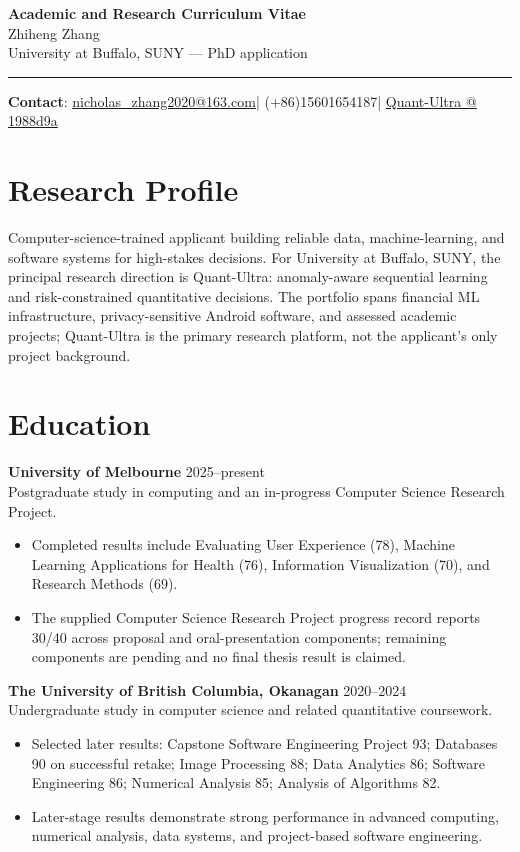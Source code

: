 \documentclass[11pt]{article}
\makeatletter
\newcommand{\ApplicantName}{Zhiheng Zhang}
\newcommand{\ApplicantEmail}{\href{mailto:nicholas_zhang2020@163.com}{nicholas\_zhang2020@163.com}}
\newcommand{\ApplicantPhone}{(+86)15601654187}
\newcommand{\ApplicantGitHub}{\href{https://github.com/zhiheng-zhang-Mera/Quant-Ultra/tree/1988d9a8530da91a8158de864d098ea869098923}{Quant-Ultra @ 1988d9a}}
\makeatother
\begin{document}
\begin{center}
{\LARGE\bfseries Academic and Research Curriculum Vitae}\\[0.25em]
{\large \ApplicantName}\\
University at Buffalo, SUNY --- PhD application
\end{center}
\vspace{0.35em}\hrule\vspace{0.65em}

\textbf{Contact}: \ApplicantEmail\quad | \quad \ApplicantPhone\quad | \quad \ApplicantGitHub

\section*{Research Profile}
Computer-science-trained applicant building reliable data, machine-learning, and software systems for high-stakes decisions. For University at Buffalo, SUNY, the principal research direction is Quant-Ultra: anomaly-aware sequential learning and risk-constrained quantitative decisions. The portfolio spans financial ML infrastructure, privacy-sensitive Android software, and assessed academic projects; Quant-Ultra is the primary research platform, not the applicant's only project background.

\section*{Education}
\textbf{University of Melbourne} \hfill 2025--present\\
Postgraduate study in computing and an in-progress Computer Science Research Project.
\begin{itemize}
\item Completed results include Evaluating User Experience (78), Machine Learning Applications for Health (76), Information Visualization (70), and Research Methods (69).
\item The supplied Computer Science Research Project progress record reports 30/40 across proposal and oral-presentation components; remaining components are pending and no final thesis result is claimed.
\end{itemize}

\textbf{The University of British Columbia, Okanagan} \hfill 2020--2024\\
Undergraduate study in computer science and related quantitative coursework.
\begin{itemize}
\item Selected later results: Capstone Software Engineering Project 93; Databases 90 on successful retake; Image Processing 88; Data Analytics 86; Software Engineering 86; Numerical Analysis 85; Analysis of Algorithms 82.
\item Later-stage results demonstrate strong performance in advanced computing, numerical analysis, data systems, and project-based software engineering.
\end{itemize}
\end{document}
